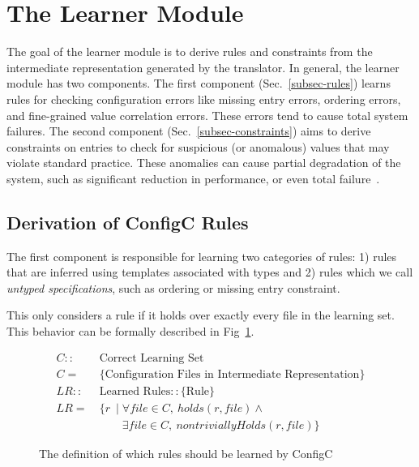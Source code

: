 \section{The Learner Module}
\label{sec-learn}


The goal of the learner module is to derive rules and constraints from
the intermediate representation generated by the translator.
In general, the learner module has two components.
The first component (Sec.~\ref{subsec-rules}) 
learns rules for checking configuration errors like
missing entry errors, ordering errors, 
and fine-grained value correlation errors. 
These errors tend to cause total system failures.
The second component (Sec.~\ref{subsec-constraints}) aims to derive 
constraints on entries to check for suspicious (or anomalous) values 
that may violate standard practice. These anomalies can cause partial 
degradation of the system, 
such as significant reduction in performance, or even 
total failure~\cite{zhang14encore}.

\iffalse
\subsection{Derivation of ConfigC Rules}

The first component is responsible for learning two categories of rules: 
1) rules that are inferred using templates associated with types 
and 2) rules which we call \emph{untyped specifications},
such as ordering or missing entry constraint.

This only considers a rule if it holds over exactly every file in 
the learning set. This behavior can be formally described in Fig~\ref{fig:configC}.

\begin{figure}[!h]
\begin{small}
\belowdisplayskip=-15pt
\abovedisplayskip=-2pt
\begin{align*}
C ::&\ \text{Correct Learning Set}\\
C =&\ \text{\{Configuration Files in Intermediate Representation\}}\\
LR ::&\ \text{Learned Rules} :: \{\textrm{Rule}\}\\
LR =&\ \{ r\ \mid \forall file \in C,\ holds(r,file) \land \\
&\qquad \ \exists file \in C,\ nontriviallyHolds(r,file)\} 
\end{align*}
\end{small}
\caption{The definition of which rules should be learned by ConfigC}
\label{fig:configC}
\end{figure}

